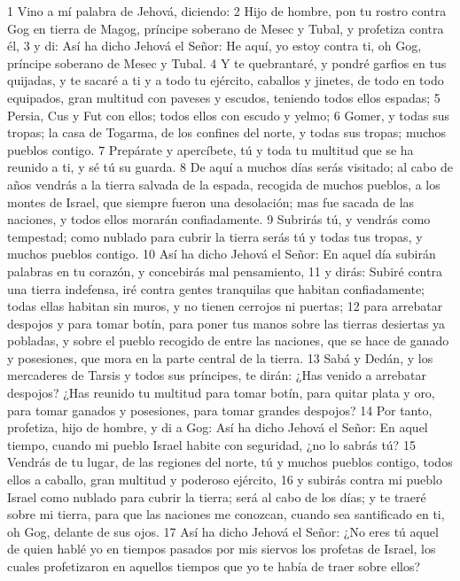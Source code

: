 1 Vino a mí palabra de Jehová, diciendo:
2 Hijo de hombre, pon tu rostro contra Gog en tierra de Magog, príncipe soberano de Mesec y Tubal, y profetiza contra él,
3 y di: Así ha dicho Jehová el Señor: He aquí, yo estoy contra ti, oh Gog, príncipe soberano de Mesec y Tubal.
4 Y te quebrantaré, y pondré garfios en tus quijadas, y te sacaré a ti y a todo tu ejército, caballos y jinetes, de todo en todo equipados, gran multitud con paveses y escudos, teniendo todos ellos espadas;
5 Persia, Cus y Fut con ellos; todos ellos con escudo y yelmo;
6 Gomer, y todas sus tropas; la casa de Togarma, de los confines del norte, y todas sus tropas; muchos pueblos contigo.
7 Prepárate y apercíbete, tú y toda tu multitud que se ha reunido a ti, y sé tú su guarda.
8 De aquí a muchos días serás visitado; al cabo de años vendrás a la tierra salvada de la espada, recogida de muchos pueblos, a los montes de Israel, que siempre fueron una desolación; mas fue sacada de las naciones, y todos ellos morarán confiadamente.
9 Subrirás tú, y vendrás como tempestad; como nublado para cubrir la tierra serás tú y todas tus tropas, y muchos pueblos contigo.
10 Así ha dicho Jehová el Señor: En aquel día subirán palabras en tu corazón, y concebirás mal pensamiento,
11 y dirás: Subiré contra una tierra indefensa, iré contra gentes tranquilas que habitan confiadamente; todas ellas habitan sin muros, y no tienen cerrojos ni puertas;
12 para arrebatar despojos y para tomar botín, para poner tus manos sobre las tierras desiertas ya pobladas, y sobre el pueblo recogido de entre las naciones, que se hace de ganado y posesiones, que mora en la parte central de la tierra.
13 Sabá y Dedán, y los mercaderes de Tarsis y todos sus príncipes, te dirán: ¿Has venido a arrebatar despojos? ¿Has reunido tu multitud para tomar botín, para quitar plata y oro, para tomar ganados y posesiones, para tomar grandes despojos?
14 Por tanto, profetiza, hijo de hombre, y di a Gog: Así ha dicho Jehová el Señor: En aquel tiempo, cuando mi pueblo Israel habite con seguridad, ¿no lo sabrás tú?
15 Vendrás de tu lugar, de las regiones del norte, tú y muchos pueblos contigo, todos ellos a caballo, gran multitud y poderoso ejército,
16 y subirás contra mi pueblo Israel como nublado para cubrir la tierra; será al cabo de los días; y te traeré sobre mi tierra, para que las naciones me conozcan, cuando sea santificado en ti, oh Gog, delante de sus ojos.
17 Así ha dicho Jehová el Señor: ¿No eres tú aquel de quien hablé yo en tiempos pasados por mis siervos los profetas de Israel, los cuales profetizaron en aquellos tiempos que yo te había de traer sobre ellos?
